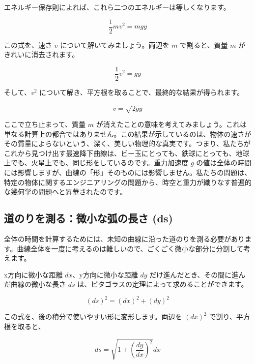 \documentclass[12pt,a4paper]{ltjsarticle}
\begin{document}
エネルギー保存則によれば、これら二つのエネルギーは等しくなります。

\begin{equation}
\frac{1}{2}mv^2 = mgy
\end{equation}

この式を、速さ $v$ について解いてみましょう。両辺を $m$ で割ると、質量 $m$ がきれいに消去されます。

\begin{equation}
\frac{1}{2}v^2 = gy
\end{equation}

そして、$v^2$ について解き、平方根を取ることで、最終的な結果が得られます。

\begin{equation}
v = \sqrt{2gy}
\end{equation}

ここで立ち止まって、質量 $m$ が消えたことの意味を考えてみましょう。これは単なる計算上の都合ではありません。この結果が示しているのは、物体の速さがその質量によらないという、深く、美しい物理的な真実です。つまり、私たちがこれから見つけ出す最速降下曲線は、ビー玉にとっても、鉄球にとっても、地球上でも、火星上でも、同じ形をしているのです。重力加速度 $g$ の値は全体の時間には影響しますが、曲線の「形」そのものには影響しません。私たちの問題は、特定の物体に関するエンジニアリングの問題から、時空と重力が織りなす普遍的な幾何学の問題へと昇華されたのです。

\subsection{道のりを測る：微小な弧の長さ (ds)}

全体の時間を計算するためには、未知の曲線に沿った道のりを測る必要があります。曲線全体を一度に考えるのは難しいので、ごくごく微小な部分に分割して考えます。

x方向に微小な距離 $dx$、y方向に微小な距離 $dy$ だけ進んだとき、その間に進んだ曲線の微小な長さ $ds$ は、ピタゴラスの定理によって求めることができます。

\begin{equation}
(ds)^2 = (dx)^2 + (dy)^2
\end{equation}

この式を、後の積分で使いやすい形に変形します。両辺を $(dx)^2$ で割り、平方根を取ると、

\begin{equation}
ds = \sqrt{1 + \left(\frac{dy}{dx}\right)^2} dx
\end{equation}
\end{document}

